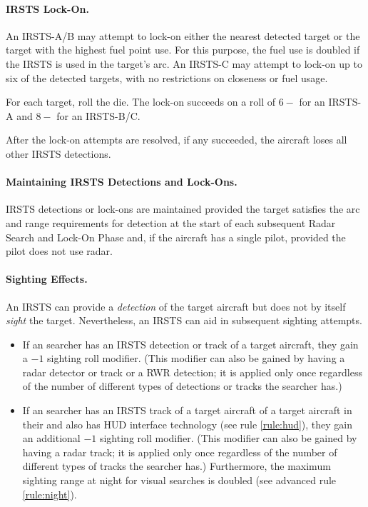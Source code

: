 \begin{advancedrules}
{

\paragraph{IRSTS Lock-On.} An IRSTS-A/B may attempt to lock-on either the nearest detected target or the target with the highest fuel point use. For this purpose, the fuel use is doubled if the IRSTS is used in the target’s   arc. An IRSTS-C may attempt to lock-on up to six of the detected targets, with no restrictions on closeness or fuel usage.

For each target, roll the die. The lock-on succeeds on a roll of $6-$ for an IRSTS-A and $8-$ for an IRSTS-B/C. 

After the lock-on attempts are resolved, if any succeeded, the aircraft loses all other IRSTS detections.

\paragraph{Maintaining IRSTS Detections and Lock-Ons.} IRSTS detections or lock-ons are maintained provided the target satisfies the arc and range requirements for detection at the start of each subsequent Radar Search and Lock-On Phase and, if the aircraft has a single pilot, provided the pilot does not use radar.

\paragraph{Sighting Effects.}
An IRSTS can provide a \emph{detection} of the target aircraft but does not by itself \emph{sight} the target. Nevertheless, an IRSTS can aid in subsequent sighting attempts. 

\begin{itemize}
\item If an searcher has an IRSTS detection or track of a target aircraft, they gain a $-1$ sighting roll modifier. (This modifier can also be gained by having a radar detector or track or a RWR detection; it is applied only once regardless of the number of different types of detections or tracks the searcher has.)
\item
If an searcher has an IRSTS track of a target aircraft of a target aircraft in their   and also has HUD interface technology (see rule \ref{rule:hud}), they gain an additional $-1$ sighting roll modifier.  (This modifier can also be gained by having a radar track; it is applied only once regardless of the number of different types of tracks the searcher has.) Furthermore, the maximum sighting range at night for visual searches is doubled (see advanced rule \ref{rule:night}).
\end{itemize}

}
\end{advancedrules}
